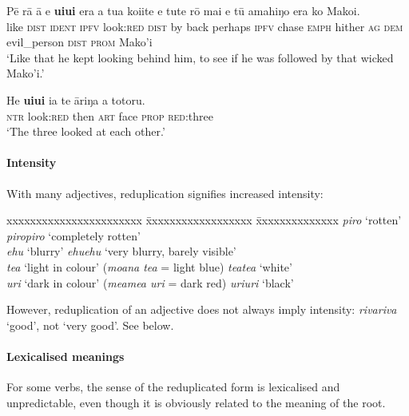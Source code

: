 \ea\label{ex:2.22}
\gll Pē rā {\ꞌ}ā e \textbf{u{\ꞌ}iu{\ꞌ}i} era a tu{\ꞌ}a koi{\ꞌ}ite e tute rō mai  e tū {\ꞌ}amahiŋo era ko Mako{\ꞌ}i.\\
like \textsc{dist} \textsc{ident} \textsc{ipfv} look:\textsc{red} \textsc{dist} by back perhaps \textsc{ipfv} chase \textsc{emph} hither  \textsc{ag} \textsc{dem} evil\_person \textsc{dist} \textsc{prom} Mako’i\\

\glt 
‘Like that he kept looking behind him, to see if he was followed by that wicked Mako’i.’ \textstyleExampleref{[R214.038]} 
\z

\ea\label{ex:2.23}
\gll He \textbf{u{\ꞌ}iu{\ꞌ}i} ia te {\ꞌ}āriŋa a totoru. \\
\textsc{ntr} look:\textsc{red} then \textsc{art} face \textsc{prop} \textsc{red}:three \\

\glt 
‘The three looked at each other.’ \textstyleExampleref{[R313.005]} 
\z

\newpage 
\paragraph{Intensity}\label{sec:2.6.2.2.3} With many adjectives, reduplication signifies increased intensity:
\ea
\begin{tabbing}
xxxxxxxxxxxxxxxxxxxxxxx \= xxxxxxxxxxxxxxxxxx \= xxxxxxxxxxxxxx \kill
  \textit{piro} ‘rotten’ \> \textit{piropiro} ‘completely rotten’\\
  \textit{{\ꞌ}ehu} ‘blurry’ \> \textit{{\ꞌ}ehu{\ꞌ}ehu} ‘very blurry, barely visible’\\
  \textit{tea} ‘light in colour’ (\textit{moana tea} = light blue) \>\> \textit{teatea} ‘white’\\
  \textit{{\ꞌ}uri} ‘dark in colour’ (\textit{meamea {\ꞌ}uri} = dark red) \>\> \textit{{\ꞌ}uri{\ꞌ}uri} ‘black’
\end{tabbing}
\z 
However, reduplication of an adjective does not always imply intensity: \textit{rivariva} ‘good’, not ‘very good’. See  below.

\paragraph{Lexicalised meanings}\label{sec:2.6.2.2.4} For some verbs, the sense of the reduplicated form is lexicalised and unpredictable, even though it is obviously related to the meaning of the root.

